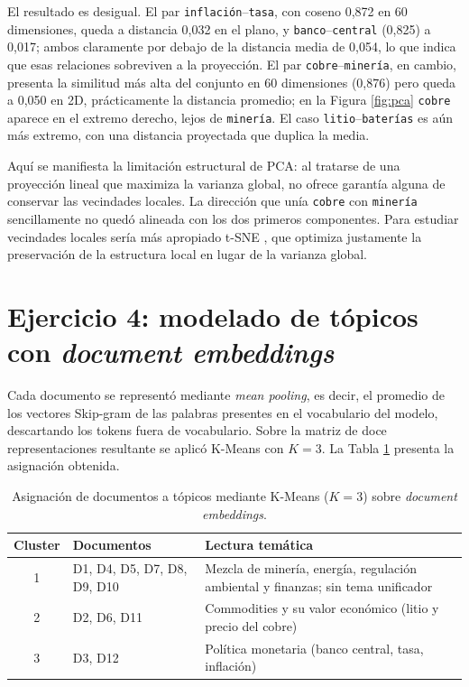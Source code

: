 \documentclass[12pt, a4paper]{article}
\newcommand{\code}[1]{\texttt{#1}}
\begin{document}
El resultado es desigual. El par \code{inflación}--\code{tasa}, con coseno 0,872 en 60 dimensiones,
queda a distancia 0,032 en el plano, y \code{banco}--\code{central} (0,825) a 0,017; ambos claramente
por debajo de la distancia media de 0,054, lo que indica que esas relaciones sobreviven a la
proyección. El par \code{cobre}--\code{minería}, en cambio, presenta la similitud más alta del
conjunto en 60 dimensiones (0,876) pero queda a 0,050 en 2D, prácticamente la distancia promedio; en
la Figura \ref{fig:pca} \code{cobre} aparece en el extremo derecho, lejos de \code{minería}. El caso
\code{litio}--\code{baterías} es aún más extremo, con una distancia proyectada que duplica la media.

Aquí se manifiesta la limitación estructural de PCA: al tratarse de una proyección lineal que
maximiza la varianza global, no ofrece garantía alguna de conservar las vecindades locales. La
dirección que unía \code{cobre} con \code{minería} sencillamente no quedó alineada con los dos
primeros componentes. Para estudiar vecindades locales sería más apropiado t-SNE
\citep{vandermaaten2008visualizing}, que optimiza justamente la preservación de la estructura local
en lugar de la varianza global.

\section{Ejercicio 4: modelado de tópicos con \textit{document embeddings}}

Cada documento se representó mediante \textit{mean pooling}, es decir, el promedio de los vectores
Skip-gram de las palabras presentes en el vocabulario del modelo, descartando los tokens fuera de
vocabulario. Sobre la matriz de doce representaciones resultante se aplicó K-Means con $K=3$. La
Tabla \ref{tab:clusters} presenta la asignación obtenida.

\begin{table}[H]
\centering
\caption{Asignación de documentos a tópicos mediante K-Means ($K=3$) sobre \textit{document embeddings}.}
\label{tab:clusters}
\small
\renewcommand{\arraystretch}{1.2}
\begin{tabular}{@{}clp{7.2cm}@{}}
\toprule
\textbf{Cluster} & \textbf{Documentos} & \textbf{Lectura temática} \\
\midrule
1 & D1, D4, D5, D7, D8, D9, D10 & Mezcla de minería, energía, regulación ambiental y finanzas; sin tema unificador \\
2 & D2, D6, D11                 & Commodities y su valor económico (litio y precio del cobre) \\
3 & D3, D12                     & Política monetaria (banco central, tasa, inflación) \\
\bottomrule
\end{tabular}
\end{table}
\end{document}
